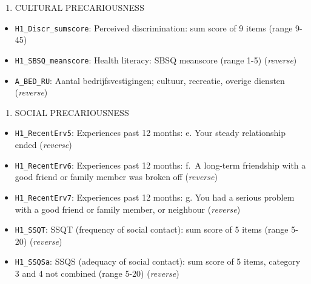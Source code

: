 \documentclass[
]{article}
\providecommand{\tightlist}{%
  \setlength{\itemsep}{0pt}\setlength{\parskip}{0pt}}\usepackage{longtable,booktabs,array}
\begin{document}
\begin{enumerate}
\def\labelenumi{\arabic{enumi}.}
\setcounter{enumi}{3}
\tightlist
\item
  CULTURAL PRECARIOUSNESS
\end{enumerate}

\begin{itemize}
\tightlist
\item
  \texttt{H1\_Discr\_sumscore}: Perceived discrimination: sum score of 9
  items (range 9-45)
\item
  \texttt{H1\_SBSQ\_meanscore}: Health literacy: SBSQ meanscore (range
  1-5) (\emph{reverse})
\item
  \texttt{A\_BED\_RU}: Aantal bedrijfsvestigingen; cultuur, recreatie,
  overige diensten (\emph{reverse})
\end{itemize}

\begin{enumerate}
\def\labelenumi{\arabic{enumi}.}
\setcounter{enumi}{4}
\tightlist
\item
  SOCIAL PRECARIOUSNESS
\end{enumerate}

\begin{itemize}
\tightlist
\item
  \texttt{H1\_RecentErv5}: Experiences past 12 months: e. Your steady
  relationship ended (\emph{reverse})
\item
  \texttt{H1\_RecentErv6}: Experiences past 12 months: f.~A long-term
  friendship with a good friend or family member was broken off
  (\emph{reverse})
\item
  \texttt{H1\_RecentErv7}: Experiences past 12 months: g. You had a
  serious problem with a good friend or family member, or neighbour
  (\emph{reverse})
\item
  \texttt{H1\_SSQT}: SSQT (frequency of social contact): sum score of 5
  items (range 5-20) (\emph{reverse})
\item
  \texttt{H1\_SSQSa}: SSQS (adequacy of social contact): sum score of 5
  items, category 3 and 4 not combined (range 5-20) (\emph{reverse})
\end{itemize}
\end{document}

